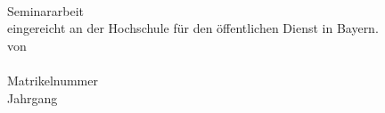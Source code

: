 \makeatletter
\begin{titlepage}
    \center %

    \textbf{\Huge \@title}\\
    {
        \large
        \vspace*{4cm}
        Seminararbeit\\
        \vspace*{2cm}
        eingereicht an der Hochschule für den öffentlichen Dienst in Bayern.\\
        \vspace*{2cm}
        von\\
        \vspace*{2cm}
        \@author \\
        Matrikelnummer \matrnr \\
        Jahrgang \classyear \\
    }


\end{titlepage}
\restoregeometry
\makeatother